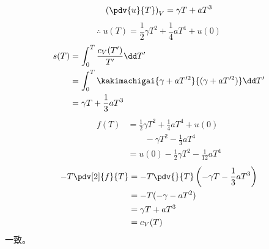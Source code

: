 \[ \left(\pdv{u}{T}\right)_{V}=\gamma T+aT^{3} \]
\[ \therefore\ u(T)=\frac{1}{2}\gamma T^{2}+\frac{1}{4}aT^{4}+u(0) \]
\begin{align*}
s(T)&=\int_{0}^{T}\frac{c_{V}(T')}{T'}\dd T'\\
&=\int_{0}^{T}\kakimachigai{\gamma+aT'^{2}}{(\gamma+aT'^{2})}\dd T'\\
&=\gamma T+\frac{1}{3}aT^{3}
\end{align*}
\begin{align*}
f(T)&=\frac{1}{2}\gamma T^{2}+\frac{1}{4}aT^{4}+u(0)\\
&\qquad-\gamma T^{2}-\frac{1}{3}aT^{4}\\
&=u(0)-\frac{1}{2}\gamma T^{2}-\frac{1}{12}aT^{4}
\end{align*}
\begin{align*}
-T\pdv[2]{f}{T}&=-T\pdv{}{T}\left(-\gamma T-\frac{1}{3}aT^{3}\right)\\
&=-T(-\gamma-aT^{2})\\
&=\gamma T+aT^{3}\\
&=c_{V}(T)
\end{align*}
一致。
